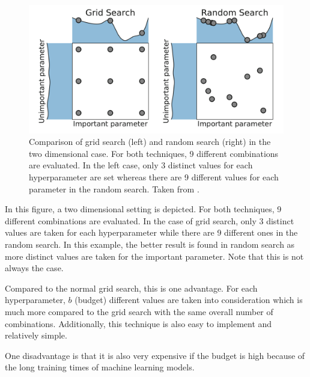 \begin{figure}[hbtp!]
	\centering
	\includegraphics[scale=0.2]{figures/comparison_searches.png}
	\caption{Comparison of grid search (left) and random search (right) in the two dimensional case. For both techniques, 9 different combinations are evaluated. In the left case, only 3 distinct values for each hyperparameter are set whereas there are 9 different values for each parameter in the random search. Taken from \cite{feurer2019hyperparameter}. }
	\label{fig:comparison_searches}
\end{figure}

In this figure, a two dimensional setting is depicted. For both techniques, 9 different combinations are evaluated. In the case of grid search, only 3 distinct values are taken for each hyperparameter while there are 9 different ones in the random search. In this example, the better result is found in random search as more distinct values are taken for the important parameter. Note that this is not always the case. 

Compared to the normal grid search, this is one advantage. For each hyperparameter, $ b $ (budget) different values are taken into consideration which is much more compared to the grid search with the same overall number of combinations. Additionally, this technique is also easy to implement and relatively simple. 

One disadvantage is that it is also very expensive if the budget is high because of the long training times of machine learning models. 


